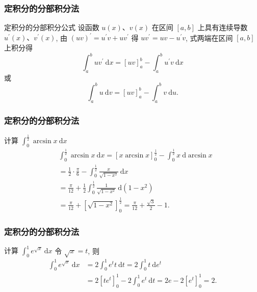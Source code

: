 \documentclass[
10pt,
aspectratio=43,
]{beamer}
\begin{document}
\begin{frame}
	\frametitle{定积分的分部积分法}
	\everymath{\displaystyle}
	\begin{block}{定积分的分部积分公式}
		设函数 $u(x) 、 v(x)$ 在区间 $[a, b]$ 上具有连续导数 $u^{\prime}(x) 、 v^{\prime}(x)$, 由 $(u v)^{\prime}=u^{\prime} v+u v^{\prime}$ 得 $u v^{\prime}=u v-u^{\prime} v$, 式两端在区间 $[a, b]$ 上积分得
		$$
			\int_a^b u v^{\prime} \mathrm{~d} x=[u v]_a^b-\int_a^b u^{\prime} v \mathrm{~d} x
		$$
		或
		$$
			\int_a^b u \mathrm{~d} v=[u v]_a^b-\int_a^b v \mathrm{~d} u.
		$$
	\end{block}
\end{frame}

\begin{frame}
	\frametitle{定积分的分部积分法}
	\everymath{\displaystyle}
	\begin{block}{计算 $\int_0^{\frac{1}{2}} \arcsin x \mathrm{~d} x$}
		$$
			\begin{aligned}
				 & \int_0^{\frac{1}{2}} \arcsin x \mathrm{~d} x=[x \arcsin x]_0^{\frac{1}{2}}-\int_0^{\frac{1}{2}} x \mathrm{~d} \arcsin x \\
				 & =\frac{1}{2} \cdot \frac{\pi}{6}-\int_0^{\frac{1}{2}} \frac{x}{\sqrt{1-x^2}} \mathrm{~d} x                              \\
				 & =\frac{\pi}{12}+\frac{1}{2} \int_0^{\frac{1}{2}} \frac{1}{\sqrt{1-x^2}} \mathrm{~d}\left(1-x^2\right)                   \\
				 & =\frac{\pi}{12}+\left[\sqrt{1-x^2}\right]_0^{\frac{1}{2}}=\frac{\pi}{12}+\frac{\sqrt{3}}{2}-1 .
			\end{aligned}
		$$
	\end{block}
\end{frame}

\begin{frame}
	\frametitle{定积分的分部积分法}
	\everymath{\displaystyle}
	\begin{block}{计算 $\int_0^1 e^{\sqrt{x}} \mathrm{~d} x$}
		令 $\sqrt{x}=t$, 则
		$$
			\begin{aligned}
				\int_0^1 e^{\sqrt{x}} \mathrm{~d} x & =2 \int_0^1 e^t t \mathrm{~d} t =2 \int_0^1 t \mathrm{~d} e^t                       \\
				                                    & =2\left[t e^t\right]_0^1-2 \int_0^1 e^t \mathrm{~d} t =2 e-2\left[e^t\right]_0^1=2.
			\end{aligned}
		$$
	\end{block}
\end{frame}
\end{document}
